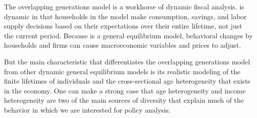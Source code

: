
The overlapping generations model is a workhorse of dynamic fiscal analysis. \ogindia is dynamic in that households in the model make consumption, savings, and labor supply decisions based on their expectations over their entire lifetime, not just the current period. Because \ogindia is a general equilibrium model, behavioral changes by households and firms can cause macroeconomic variables and prices to adjust.

But the main characteristic that differentiates the overlapping generations model from other dynamic general equilibrium models is its realistic modeling of the finite lifetimes of individuals and the cross-sectional age heterogeneity that exists in the economy. One can make a strong case that age heterogeneity and income heterogeneity are two of the main sources of diversity that explain much of the behavior in which we are interested for policy analysis.

